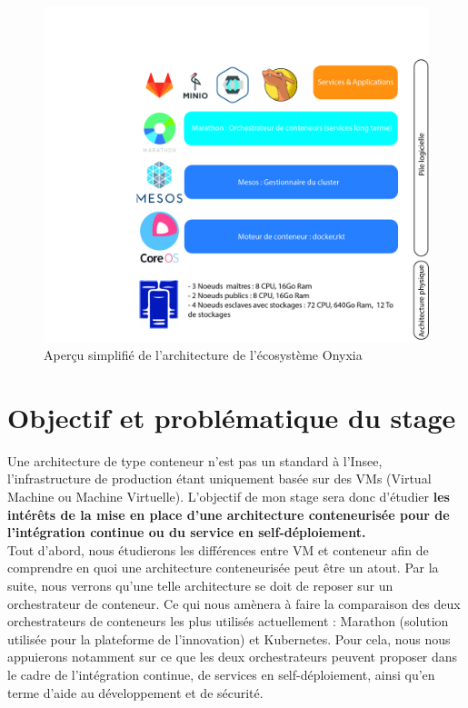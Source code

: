 \documentclass[11pt,fleqn]{book} %
\begin{document}
\begin{figure}[H]\centering
\renewcommand{\figurename}{Schéma}
\includegraphics[scale=0.2,clip,trim={18cm, 0cm, 0cm, 11.6cm}]{Pictures/onyxia/Onyxia archi.jpg}
\captionsetup{margin=1.5cm,format=hang,justification=justified}
\caption[]{Aperçu simplifié de l'architecture de l'écosystème Onyxia \newline}
\end{figure}


\section{Objectif et problématique du stage}
Une architecture de type conteneur n'est pas un standard à l'Insee, l'infrastructure de production étant uniquement basée sur des VMs (Virtual Machine ou Machine Virtuelle). L'objectif de mon stage sera donc d'étudier \textbf{les intérêts de la mise en place d'une architecture conteneurisée pour de l'intégration continue ou du service en self-déploiement.}\\

Tout d'abord, nous étudierons les différences entre VM et conteneur afin de comprendre en quoi une architecture conteneurisée peut être un atout. Par la suite, nous verrons qu'une telle architecture se doit de reposer sur un orchestrateur de conteneur. Ce qui nous amènera à faire la comparaison des deux orchestrateurs de conteneurs les plus utilisés actuellement : Marathon (solution utilisée pour la plateforme de l'innovation) et Kubernetes. Pour cela, nous nous appuierons notamment sur ce que les deux orchestrateurs peuvent proposer dans le cadre de l'intégration continue, de services en self-déploiement, ainsi qu'en terme d'aide au développement et de sécurité.
\end{document}
